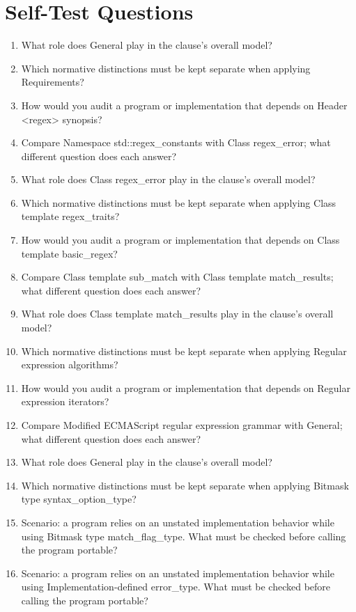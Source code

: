 \documentclass[11pt,letterpaper]{article}
\begin{document}
\section{Self-Test Questions}
\begin{enumerate}
\item What role does General play in the clause's overall model?
\item Which normative distinctions must be kept separate when applying Requirements?
\item How would you audit a program or implementation that depends on Header <regex> synopsis?
\item Compare Namespace std::regex\_\allowbreak{}constants with Class regex\_\allowbreak{}error; what different question does each answer?
\item What role does Class regex\_\allowbreak{}error play in the clause's overall model?
\item Which normative distinctions must be kept separate when applying Class template regex\_\allowbreak{}traits?
\item How would you audit a program or implementation that depends on Class template basic\_\allowbreak{}regex?
\item Compare Class template sub\_\allowbreak{}match with Class template match\_\allowbreak{}results; what different question does each answer?
\item What role does Class template match\_\allowbreak{}results play in the clause's overall model?
\item Which normative distinctions must be kept separate when applying Regular expression algorithms?
\item How would you audit a program or implementation that depends on Regular expression iterators?
\item Compare Modified ECMAScript regular expression grammar with General; what different question does each answer?
\item What role does General play in the clause's overall model?
\item Which normative distinctions must be kept separate when applying Bitmask type syntax\_\allowbreak{}option\_\allowbreak{}type?
\item Scenario: a program relies on an unstated implementation behavior while using Bitmask type match\_\allowbreak{}flag\_\allowbreak{}type. What must be checked before calling the program portable?
\item Scenario: a program relies on an unstated implementation behavior while using Implementation-defined error\_\allowbreak{}type. What must be checked before calling the program portable?
\end{enumerate}
\end{document}
